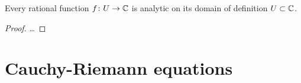 \begin{lemma}
  \label{lem:rational_function_analytic}
  Every rational function $f \colon U \to \mathbb{C}$ is analytic
  on its domain of definition $U \subset \mathbb{C}$.
\end{lemma}
\begin{proof}
  \ldots
\end{proof}



\section{Cauchy-Riemann equations}


